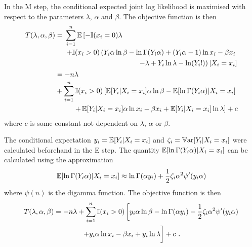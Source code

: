 In the M step, the conditional expected joint log likelihood is maximised with respect to the parameters $\lambda$, $\alpha$ and $\beta$. The objective function is then
\begin{align}
  T(\lambda,\alpha,\beta)&=
  \begin{multlined}[t]
    \sum_{i=1}^n
    \expectation\left[
      -\mathbb{I}(x_i=0)
      \lambda
    \right.
    \\
    \left.+
      \mathbb{I}(x_i>0)
      \left(
        Y_i\alpha\ln\beta-\ln\Gamma(Y_i\alpha)+(Y_i\alpha-1)\ln x_i - \beta x_i
      \right.
    \right.
    \\
    \left.
      \left.  
        - \lambda + Y_i \ln \lambda - \ln(Y_i!)
      \right)
      |X_i=x_i
    \right]
  \end{multlined}
  \nonumber\\
  &\!\begin{multlined}[b]=
    -n\lambda
    \\
    +\sum_{i=1}^n
    \mathbb{I}(x_i>0)
    \left[
      \expectation[Y_i|X_i=x_i]\alpha\ln\beta-\expectation[\ln\Gamma(Y_i\alpha)|X_i=x_i]
    \right.
    {}\\
    \left.
      +\expectation[Y_i|X_i=x_i]\alpha\ln x_i - \beta x_i
      + \expectation[Y_i|X_i=x_i] \ln \lambda
    \right] + c
  \end{multlined}
\end{align}
where $c$ is some constant not dependent on $\lambda$, $\alpha$ or $\beta$.

The conditional expectation $y_i = \operatorname{\mathbb{E}}[Y_i|X_i=x_i]$ and $\zeta_i = \operatorname{\mathbb{V}ar}[Y_i|X_i=x_i]$ were calculated beforehand in the E step. The quantity $\operatorname{\mathbb{E}}[\ln\Gamma(Y_i\alpha)|X_i=x_i]$ can be calculated using the approximation
\begin{equation}
  \operatorname{\mathbb{E}}[\ln\Gamma(Y_i\alpha)|X_i=x_i] \approx
  \ln\Gamma(\alpha y_i) + \frac{1}{2}\zeta_i\alpha^2\psi'(y_i\alpha)
\end{equation}
where $\psi(n)$ is the digamma function. The objective function is then
\begin{multline}
  T(\lambda,\alpha,\beta)=
  -n\lambda
  +\sum_{i=1}^n
  \mathbb{I}(x_i>0)
  \left[
    y_i\alpha\ln\beta-\ln\Gamma(\alpha y_i) - \frac{1}{2}\zeta_i\alpha^2\psi'(y_i\alpha)
  \right.
  \\
  \left.
    +y_i\alpha\ln x_i - \beta x_i
    + y_i \ln \lambda
    \vphantom{\frac{1}{1}}
  \right]
  + c
  \ .
\end{multline}

